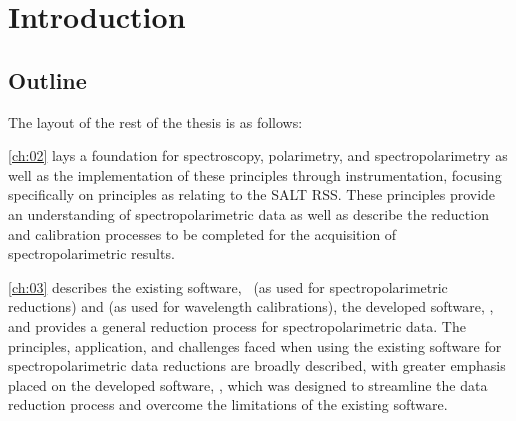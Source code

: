 \chapter{Introduction} \label{ch:01}






\section{Outline}

\noindent The layout of the rest of the thesis is as follows:

\autoref{ch:02} lays a foundation for spectroscopy, polarimetry, and spectropolarimetry as well as the implementation of these principles through instrumentation, focusing specifically on principles as relating to the \gls{SALT} \gls{RSS}.
These principles provide an understanding of spectropolarimetric data as well as describe the reduction and calibration processes to be completed for the acquisition of spectropolarimetric results.

\autoref{ch:03} describes the existing software, \polsalt\ (as used for spectropolarimetric reductions) and \iraf (as used for wavelength calibrations), the developed software, \stops, and provides a general reduction process for spectropolarimetric data.
The principles, application, and challenges faced when using the existing software for spectropolarimetric data reductions are broadly described, with greater emphasis placed on the developed software, \stops, which was designed to streamline the data reduction process and overcome the limitations of the existing software.

